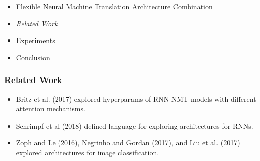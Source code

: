 \begin{frame}

\begin{itemize}
    \item Flexible Neural Machine Translation Architecture Combination
    \item \emph{\color{UOYellow}Related Work}
    \item Experiments
    \item Conclusion
\end{itemize}

\end{frame}

\begin{frame}
    \frametitle{Related Work}
    \begin{itemize}
        \item Britz et al. (2017) explored hyperparams of RNN NMT models with
            different attention mechanisms.
        \item Schrimpf et al (2018) defined language for exploring architectures
            for RNNs.
        \item Zoph and Le (2016), Negrinho and Gordan (2017), and Liu et al.
            (2017) explored architectures for image classification.
    \end{itemize}
\end{frame}
